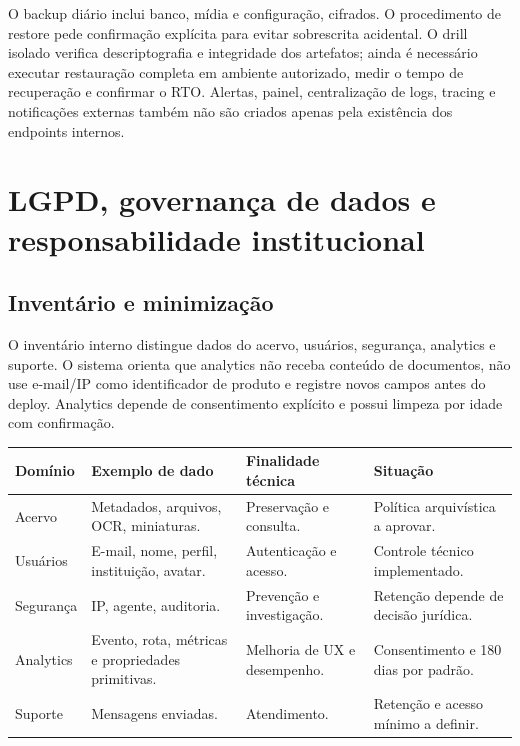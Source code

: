 \documentclass[11pt,a4paper]{article}
\begin{document}
O backup diário inclui banco, mídia e configuração, cifrados. O procedimento de restore pede confirmação explícita para evitar sobrescrita acidental. O drill isolado verifica descriptografia e integridade dos artefatos; ainda é necessário executar restauração completa em ambiente autorizado, medir o tempo de recuperação e confirmar o RTO. Alertas, painel, centralização de logs, tracing e notificações externas também não são criados apenas pela existência dos endpoints internos.

\section{LGPD, governança de dados e responsabilidade institucional}

\subsection{Inventário e minimização}

O inventário interno distingue dados do acervo, usuários, segurança, analytics e suporte. O sistema orienta que analytics não receba conteúdo de documentos, não use e-mail/IP como identificador de produto e registre novos campos antes do deploy. Analytics depende de consentimento explícito e possui limpeza por idade com confirmação.

\begin{longtable}{P{0.18\textwidth}P{0.27\textwidth}P{0.25\textwidth}P{0.17\textwidth}}
\toprule
\textbf{Domínio} & \textbf{Exemplo de dado} & \textbf{Finalidade técnica} & \textbf{Situação} \\
\midrule
\endhead
\bottomrule
\endfoot
Acervo & Metadados, arquivos, OCR, miniaturas. & Preservação e consulta. & Política arquivística a aprovar. \\
Usuários & E-mail, nome, perfil, instituição, avatar. & Autenticação e acesso. & Controle técnico implementado. \\
Segurança & IP, agente, auditoria. & Prevenção e investigação. & Retenção depende de decisão jurídica. \\
Analytics & Evento, rota, métricas e propriedades primitivas. & Melhoria de UX e desempenho. & Consentimento e 180 dias por padrão. \\
Suporte & Mensagens enviadas. & Atendimento. & Retenção e acesso mínimo a definir. \\
\end{longtable}
\end{document}
